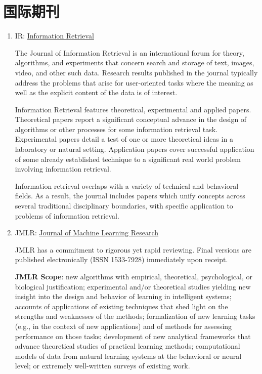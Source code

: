 \section{国际期刊}
\begin{enumerate}[（1）]
\item IR: \href{http://link.springer.com/journal/10791}{Information Retrieval}

The Journal of Information Retrieval is an international forum for theory, algorithms, and experiments that concern search and storage of text, images, video, and other such data. Research results published in the journal typically address the problems that arise for user-oriented tasks where the meaning as well as the explicit content of the data is of interest.

Information Retrieval features theoretical, experimental and applied papers. Theoretical papers report a significant conceptual advance in the design of algorithms or other processes for some information retrieval task. Experimental papers detail a test of one or more theoretical ideas in a laboratory or natural setting. Application papers cover successful application of some already established technique to a significant real world problem involving information retrieval.

Information retrieval overlaps with a variety of technical and behavioral fields. As a result, the journal includes papers which unify concepts across several traditional disciplinary boundaries, with specific application to problems of information retrieval.

\item JMLR: \href{http://jmlr.csail.mit.edu/}{Journal of Machine Learning Research}

JMLR has a commitment to rigorous yet rapid reviewing. Final versions are published electronically (ISSN 1533-7928) immediately upon receipt.

\textbf{JMLR Scope}: new algorithms with empirical, theoretical, psychological, or biological justification; experimental and/or theoretical studies yielding new insight into the design and behavior of learning in intelligent systems; accounts of applications of existing techniques that shed light on the strengths and weaknesses of the methods; formalization of new learning tasks (e.g., in the context of new applications) and of methods for assessing performance on those tasks; development of new analytical frameworks that advance theoretical studies of practical learning methods; computational models of data from natural learning systems at the behavioral or neural level; or extremely well-written surveys of existing work.


\end{enumerate}
